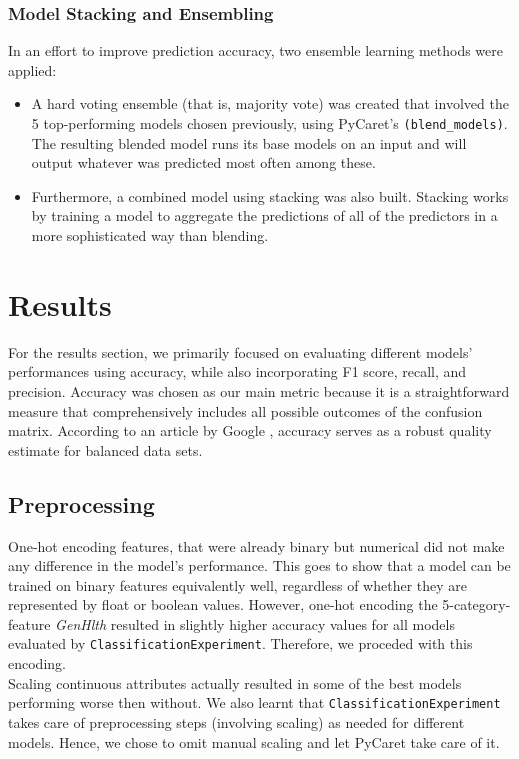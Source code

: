\documentclass[a4paper,12pt]{article}
\begin{document}
\subsubsection{Model Stacking and Ensembling}
In an effort to improve prediction accuracy, two ensemble learning methods were applied:
\begin{itemize}
    \item A hard voting ensemble (that is, majority vote) was created that involved 
    the 5 top-performing models chosen previously, using PyCaret's \texttt{(blend\_models)}. 
    The resulting blended model runs its base models on an input
    and will output whatever was predicted most often among these.
    \item Furthermore, a combined model using stacking was also built. 
    Stacking works by training a model to aggregate the predictions of all of the predictors in a more
    sophisticated way than blending.
\end{itemize} 

\section{Results}
For the results section, we primarily focused on evaluating different models' performances using accuracy, while also
incorporating F1 score, recall, and precision. Accuracy was chosen as our main metric because it is a 
straightforward measure that comprehensively includes all possible outcomes of the confusion matrix. 
According to an article by Google \cite{Google}, accuracy serves as a robust quality estimate for balanced data sets.

\subsection{Preprocessing}
One-hot encoding features, that were already binary but numerical did not make any difference in the model's
performance. This goes to show that a model can be trained on binary features equivalently well, regardless
of whether they are represented by float or boolean values. However, one-hot encoding the 5-category-feature
\textit{GenHlth} resulted in slightly higher accuracy values for all models evaluated by \texttt{ClassificationExperiment}.
Therefore, we proceded with this encoding.
\\
Scaling continuous attributes actually resulted in some of the best models performing worse then without.
We also learnt that \texttt{ClassificationExperiment} takes care of preprocessing steps (involving scaling)
as needed for different models. Hence, we chose to omit manual scaling and let PyCaret take care of it.
\end{document}
